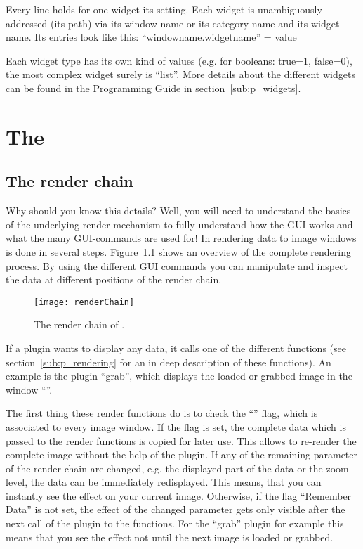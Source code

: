 Every line holds for one \icewing{} widget its setting. Each widget
is unambiguously addressed (its path) via its window name or its
category name and its widget name.
Its entries look like this: ``windowname.widgetname'' = value

Each widget type has its own kind of values (e.g. for booleans: true=1,
false=0), the most complex widget surely is ``list''. More details
about the different widgets can be found in the Programming Guide in
section~\ref{sub:p_widgets}.

\chapter{The }

\section{The \icewing{} render chain}
\label{sec:renderchain}

Why should you know this details? Well, you will need to understand
the basics of the underlying render mechanism to fully understand
how the GUI works and what the many GUI-commands are used for!
In \icewing{} rendering data to image windows is done in several
steps. Figure~\ref{fig:renderChain} shows an overview of the
complete rendering process. By using the different GUI commands you
can manipulate and inspect the data at different positions of the
render chain.

\begin{figure}[h]
 \begin {center}
  \texttt{[image: renderChain]}
  \caption{The render chain of \icewing{}.}
  \label{fig:renderChain}
  \end{center}
\end{figure}

If a plugin wants to display any data, it calls one of the different
 functions (see
section~\ref{sub:p_rendering} for an in deep description of these
functions). An example is the plugin ``grab'', which displays the
loaded or grabbed image in the window ``''.

The first thing these render functions do is to check the
``'' flag, which is associated to every image
window. If the flag is set, the complete data which is passed to the
render functions is copied for later use. This allows to re-render
the complete image without the help of the plugin. If any of the
remaining parameter of the render chain are changed, e.g. the
displayed part of the data or the zoom level, the data can be
immediately redisplayed. This means, that you can instantly see the
effect on your current image. Otherwise, if the flag ``Remember
Data'' is not set, the effect of the changed parameter gets only
visible after the next call of the plugin to the
 functions. For the ``grab'' plugin for
example this means that you see the effect not until the next image
is loaded or grabbed.

